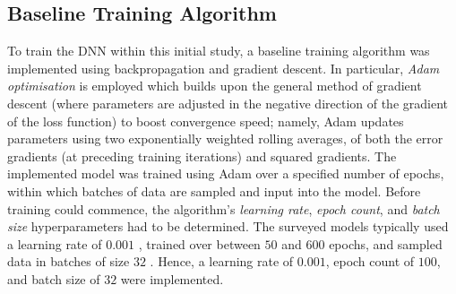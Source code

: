 \documentclass[a4paper, 11pt]{report}
\begin{document}
    \subsection{Baseline Training Algorithm}

    To train the DNN within this initial study, a baseline training algorithm was implemented using backpropagation and gradient descent. In particular, \emph{Adam optimisation} \citep{adam} is employed which builds upon the general method of gradient descent (where parameters are adjusted in the negative direction of the gradient of the loss function) to boost convergence speed; namely, Adam updates parameters using two exponentially weighted rolling averages, of both the error gradients (at preceding training iterations) and squared gradients. The implemented model was trained using Adam over a specified number of epochs, within which batches of data are sampled and input into the model. Before training could commence, the algorithm's \emph{learning rate}, \emph{epoch count}, and \emph{batch size} hyperparameters had to be determined. The surveyed models typically used a learning rate of $0.001$ \citep{zhang-2022}, trained over between $50$ \citep{rahimikia-2020} and $600$ \citep{xiong-2016} epochs, and sampled data in batches of size $32$ \citep{xiong-2016}. Hence, a learning rate of $0.001$, epoch count of $100$, and batch size of $32$ were implemented.
\end{document}
